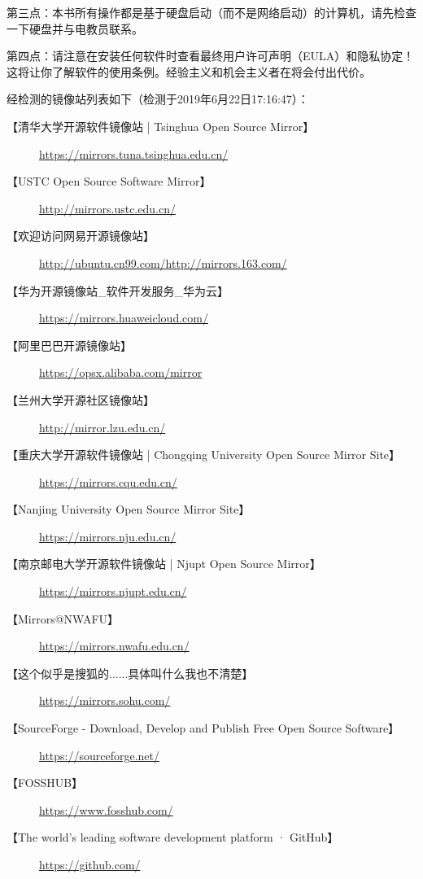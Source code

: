   第三点：本书所有操作都是基于硬盘启动（而不是网络启动）的计算机，请先检查一下硬盘并与电教员联系。\par 
  第四点：请注意在安装任何软件时查看最终用户许可声明（EULA）和隐私协定！这将让你了解软件的使用条例。经验主义和机会主义者在将会付出代价。
\begin{center}\Large {\color{red}{本书将不会提供任何有关破解专有软件的方法\\或进行反向工程、反向汇编、反向编译的知识。}\normalall}\end{center}
经检测的镜像站列表如下（检测于2019年6月22日17:16:47）：
\begin{description}
	\item [【清华大学开源软件镜像站 | Tsinghua Open Source Mirror】]\url{https://mirrors.tuna.tsinghua.edu.cn/}
	\item [【USTC Open Source Software Mirror】]\url{http://mirrors.ustc.edu.cn/}
	\item [【欢迎访问网易开源镜像站】]\url{http://ubuntu.cn99.com/}\url{http://mirrors.163.com/}
	\item [【华为开源镜像站\_软件开发服务\_华为云】]\url{https://mirrors.huaweicloud.com/}
	\item [【阿里巴巴开源镜像站】]\url{https://opsx.alibaba.com/mirror}
	\item [【兰州大学开源社区镜像站】]\url{http://mirror.lzu.edu.cn/}
	\item [【重庆大学开源软件镜像站 | Chongqing University Open Source Mirror Site】] \url{https://mirrors.cqu.edu.cn/}
	\item [【Nanjing University Open Source Mirror Site】] \url{https://mirrors.nju.edu.cn/}
	\item [【南京邮电大学开源软件镜像站 | Njupt Open Source Mirror】]\url{https://mirrors.njupt.edu.cn/}
	\item [【Mirrors@NWAFU】]\url{https://mirrors.nwafu.edu.cn/}
	\item [【这个似乎是搜狐的......具体叫什么我也不清楚】]\url{https://mirrors.sohu.com/}
	\item [【SourceForge - Download, Develop and Publish Free Open Source Software】] \url{https://sourceforge.net/}
	\item [【FOSSHUB】] \url{https://www.fosshub.com/}
	\item [【The world’s leading software development platform · GitHub】] \url{https://github.com/}
\end{description}
